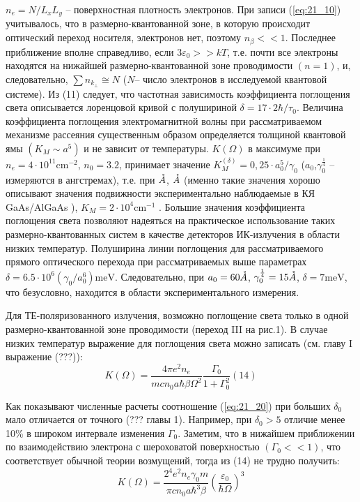 { $n_{e} =N/L_{x} L_{y} $ – поверхностная плотность электронов. При записи (\ref{eq:21_10}) учитывалось, что в размерно-квантованной зоне, в которую происходит оптический переход носителя, электронов нет, поэтому  $n_{\beta } <<1$. Последнее приближение вполне справедливо, если  $3\varepsilon _{0} >>kT$, т.е. почти все электроны находятся на нижайшей размерно-квантованной зоне проводимости $(n=1)$, и, следовательно,   $\sum n_{k_{\bot } } \cong N$ ($N$– число электронов в исследуемой квантовой системе). Из (11) следует, что частотная зависимость коэффициента поглощения света описывается лоренцовой кривой с полушириной  $\delta =17\cdot 2\hbar /\tau _{0} $. Величина коэффициента поглощения электромагнитной волны при рассматриваемом механизме рассеяния существенным образом определяется толщиной квантовой ямы $\left(K_{M} \sim a^{5} \right)$ и не зависит от температуры. $K\left(\Omega \right)$  в максимуме при $n_{e} =4\cdot 10^{11} \text{cm}^{-2} $, $n_{0} =3.2$,   принимает значение   $K_{M}^{\left(\delta \right)} =0,25\cdot a_{0}^{5} /\gamma _{0} $ ($a_{0} $,$\gamma _{0}^{\frac{1}{4}} $ – измеряются в ангстремах), т.е. при  $\AA$,  $\AA$ (именно такие значения   хорошо описывают значения подвижности   экспериментально наблюдаемые в КЯ GaAs/AlGaAs \cite{West1985}), $K_{M} =2\cdot 10^{4} \text{cm}^{-1} $ . Большие значения коэффициента поглощения света позволяют надеяться на практическое использование таких размерно-квантованных систем в качестве детекторов ИК-излучения в области низких температур. Полуширина линии поглощения для рассматриваемого прямого оптического перехода при рассматриваемых выше параметрах $\delta =6.5\cdot 10^{6} \left(\gamma _{0} /a_{0}^{6} \right)\text{meV}$. Следовательно, при  $a_{0} = 60 \AA$,  $\gamma _{0}^{\frac{1}{4}} = 15 \AA$,  $\delta = 7 \text{meV}$, что безусловно, находится в области экспериментального измерения.

Для ТЕ-поляризованного излучения, возможно поглощение света только в одной размерно-квантованной зоне проводимости (переход III на рис.1). В случае низких температур выражение для поглощения света можно записать (см. главу I выражение (???)):
\begin{equation} \label{eq:21_20}
K(\Omega )=\frac{4\pi e^{2} n_{e} }{mcn_{0} a\hbar \beta \Omega ^{2} } \frac{\Gamma _{0} }{1+\Gamma _{0}^{2} }   (14)
\end{equation} 

Как показывают численные расчеты соотношение (\ref{eq:21_20}) при больших $\delta $${}_{0}$ мало отличается от точного (??? главы 1). Например, при $\delta_{0} > 5$ отличие менее 10\% в широком интервале изменения $\Gamma_{0}$. Заметим, что в нижайшем приближении по взаимодействию электрона с шероховатой поверхностью $(\Gamma_{0}<<1)$, что соответствует обычной теории возмущений, тогда из (14) не трудно получить:
\begin{equation} \label{eq:21_30}
K(\Omega )=\frac{2^{4} e^{2} n_{e} \gamma _{0} m}{\pi cn_{0} a\hbar ^{3} \beta } \left(\frac{\varepsilon _{0} }{\hbar \Omega } \right)^{3}
\end{equation} 

}
